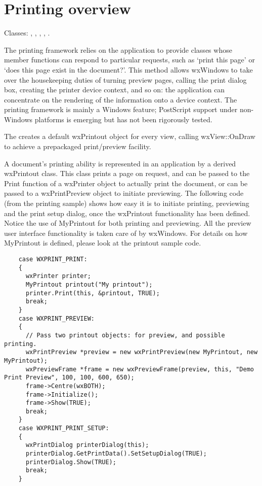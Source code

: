 \section{Printing overview}\label{printingoverview}

Classes: , ,\rtfsp
{}, ,\rtfsp
{}.

The printing framework relies on the application to provide classes
whose member functions can respond to particular requests, such
as `print this page' or `does this page exist in the document?'.
This method allows wxWindows to take over the housekeeping duties of
turning preview pages, calling the print dialog box, creating
the printer device context, and so on: the application can concentrate
on the rendering of the information onto a device context.
The printing framework is mainly a Windows feature; PostScript
support under non-Windows platforms is emerging but has not been rigorously tested.

The  creates a default wxPrintout
object for every view, calling wxView::OnDraw to achieve a
prepackaged print/preview facility.

A document's printing ability is represented in an application by a
derived wxPrintout class. This class prints a page on request, and can
be passed to the Print function of a wxPrinter object to actually print
the document, or can be passed to a wxPrintPreview object to initiate
previewing. The following code (from the printing sample) shows how easy
it is to initiate printing, previewing and the print setup dialog, once the wxPrintout
functionality has been defined. Notice the use of MyPrintout for
both printing and previewing. All the preview user interface functionality
is taken care of by wxWindows. For details on how MyPrintout is defined,
please look at the printout sample code.

\begin{verbatim}
    case WXPRINT_PRINT:
    {
      wxPrinter printer;
      MyPrintout printout("My printout");
      printer.Print(this, &printout, TRUE);
      break;
    }
    case WXPRINT_PREVIEW:
    {
      // Pass two printout objects: for preview, and possible printing.
      wxPrintPreview *preview = new wxPrintPreview(new MyPrintout, new MyPrintout);
      wxPreviewFrame *frame = new wxPreviewFrame(preview, this, "Demo Print Preview", 100, 100, 600, 650);
      frame->Centre(wxBOTH);
      frame->Initialize();
      frame->Show(TRUE);
      break;
    }
    case WXPRINT_PRINT_SETUP:
    {
      wxPrintDialog printerDialog(this);
      printerDialog.GetPrintData().SetSetupDialog(TRUE);
      printerDialog.Show(TRUE);
      break;
    }
\end{verbatim}

